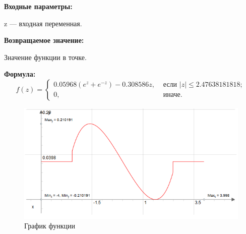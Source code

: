 \textbf{Входные параметры:}
 
z --- входная переменная.

\textbf{Возвращаемое значение:}
 
Значение функции в точке.

\textbf{Формула:}
\begin{equation*}
f\left(z \right)=\left\lbrace \begin{aligned} 0.05968\left( e^z+e^{-z}\right)-0.308586 z,& \text{ если } \left| z\right|\leq 2.47638181818 ; \\ 0,& \text{ иначе}. \end{aligned}\right.
\end{equation*}

 \begin{figure} [h] 
   \center
   \includegraphics {MHL_DerivativeOfBellShapedKernelExp_Graph.png}
   \caption{График функции} 
   \label{img:MHL_DerivativeOfBellShapedKernelExp_Graph}  
 \end{figure}
